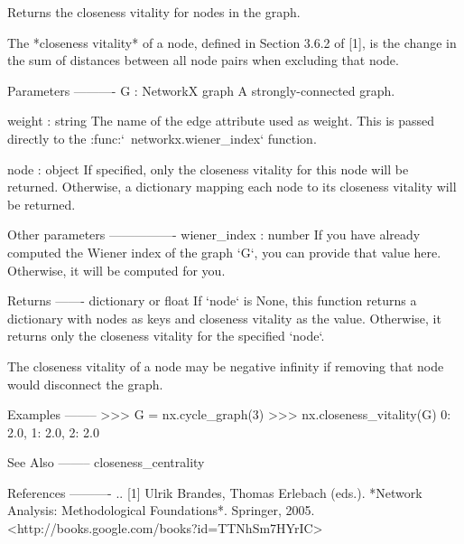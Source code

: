 \begin{DoxyVerb}Returns the closeness vitality for nodes in the graph.

The *closeness vitality* of a node, defined in Section 3.6.2 of [1],
is the change in the sum of distances between all node pairs when
excluding that node.

Parameters
----------
G : NetworkX graph
    A strongly-connected graph.

weight : string
    The name of the edge attribute used as weight. This is passed
    directly to the :func:`~networkx.wiener_index` function.

node : object
    If specified, only the closeness vitality for this node will be
    returned. Otherwise, a dictionary mapping each node to its
    closeness vitality will be returned.

Other parameters
----------------
wiener_index : number
    If you have already computed the Wiener index of the graph
    `G`, you can provide that value here. Otherwise, it will be
    computed for you.

Returns
-------
dictionary or float
    If `node` is None, this function returns a dictionary
    with nodes as keys and closeness vitality as the
    value. Otherwise, it returns only the closeness vitality for the
    specified `node`.

    The closeness vitality of a node may be negative infinity if
    removing that node would disconnect the graph.

Examples
--------
>>> G = nx.cycle_graph(3)
>>> nx.closeness_vitality(G)
{0: 2.0, 1: 2.0, 2: 2.0}

See Also
--------
closeness_centrality

References
----------
.. [1] Ulrik Brandes, Thomas Erlebach (eds.).
       *Network Analysis: Methodological Foundations*.
       Springer, 2005.
       <http://books.google.com/books?id=TTNhSm7HYrIC>\end{DoxyVerb}
 